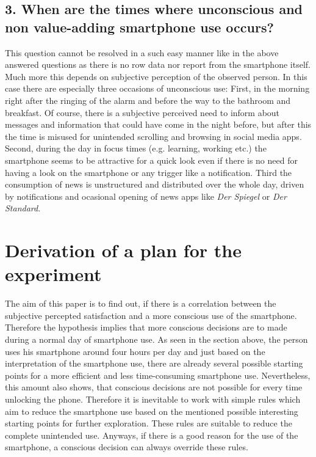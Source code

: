 \subsection*{3. When are the times where unconscious and non value-adding smartphone use occurs?}
This question cannot be resolved in a such easy manner like in the above answered questions as there is no row data nor report from the smartphone itself. Much more this depends on subjective perception of the observed person. In this case there are especially three occasions of unconscious use: First, in the morning right after the ringing of the alarm and before the way to the bathroom and breakfast. Of course, there is a subjective perceived need to inform about messages and information that could have come in the night before, but after this the time is misused for unintended scrolling and browsing in social media apps. Second, during the day in focus times (e.g. learning, working etc.) the smartphone seems to be attractive for a quick look even if there is no need for having a look on the smartphone or any trigger like a notification. Third the consumption of news is unstructured and distributed over the whole day, driven by notifications and ocasional opening of news apps like \textit{Der Spiegel} or \textit{Der Standard}.

\section*{Derivation of a plan for the experiment}
The aim of this paper is to find out, if there is a correlation between the subjective percepted satisfaction and a more conscious use of the smartphone. Therefore the hypothesis implies that more conscious decisions are to made during a normal day of smartphone use. As seen in the section above, the person uses his smartphone around four hours per day and just based on the interpretation of the smartphone use, there are already several possible starting points for a more efficient and less time-consuming smartphone use. Nevertheless, this amount also shows, that conscious decisions are not possible for every time unlocking the phone. Therefore it is inevitable to work with simple rules which aim to reduce the smartphone use based on the mentioned possible interesting starting points for further exploration. These rules are suitable to reduce the complete unintended use. Anyways, if there is a good reason for the use of the smartphone, a conscious decision can always override these rules.

